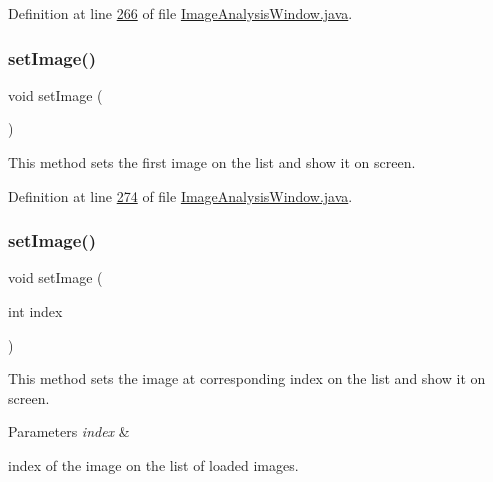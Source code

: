 Definition at line \hyperlink{_image_analysis_window_8java_source_l00266}{266} of file \hyperlink{_image_analysis_window_8java_source}{Image\+Analysis\+Window.\+java}.

\hypertarget{classgui_1_1_image_analysis_window_a3e14b1197961eed6fd530110e15380ec}{}\label{classgui_1_1_image_analysis_window_a3e14b1197961eed6fd530110e15380ec} 
\subsubsection{\texorpdfstring{set\+Image()}{setImage()}\hspace{0.1cm}{\footnotesize\ttfamily [1/2]}}
{\footnotesize\ttfamily void set\+Image (\begin{DoxyParamCaption}{ }\end{DoxyParamCaption})}

This method sets the first image on the list and show it on screen. 

Definition at line \hyperlink{_image_analysis_window_8java_source_l00274}{274} of file \hyperlink{_image_analysis_window_8java_source}{Image\+Analysis\+Window.\+java}.

\hypertarget{classgui_1_1_image_analysis_window_a04b5ca8d2004b3a622268e038a238455}{}\label{classgui_1_1_image_analysis_window_a04b5ca8d2004b3a622268e038a238455} 
\subsubsection{\texorpdfstring{set\+Image()}{setImage()}\hspace{0.1cm}{\footnotesize\ttfamily [2/2]}}
{\footnotesize\ttfamily void set\+Image (\begin{DoxyParamCaption}\item[{int}]{index }\end{DoxyParamCaption})}

This method sets the image at corresponding index on the list and show it on screen.


\begin{DoxyParams}{Parameters}
{\em index} & 
\begin{DoxyItemize}
\item index of the image on the list of loaded images. 
\end{DoxyItemize}\\
\hline
\end{DoxyParams}


